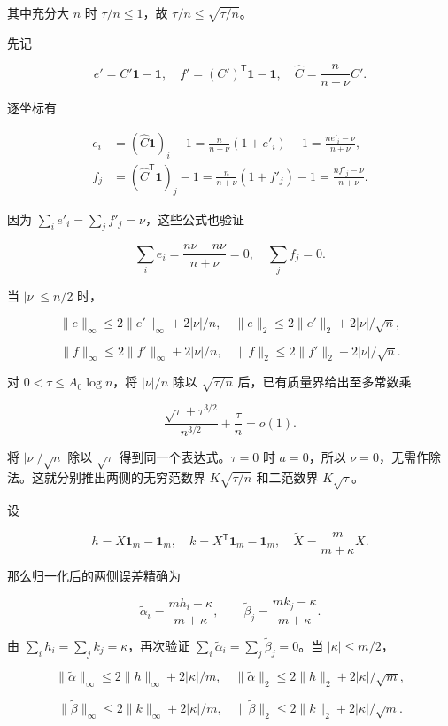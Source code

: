 \documentclass[11pt,a4paper]{article}
\begin{document}
其中充分大 \(n\) 时 \(\tau/n\le1\)，故 \(\tau/n\le\sqrt{\tau/n}\)。

先记

\[
e'=C'\mathbf1-\mathbf1,\quad
f'=(C')^{\mathsf T}\mathbf1-\mathbf1,\quad
\widehat C=\frac n{n+\nu}C'.
\]

逐坐标有

\[
\begin{aligned}
e_i&=(\widehat C\mathbf1)_i-1
=\frac n{n+\nu}(1+e'_i)-1
=\frac{ne'_i-\nu}{n+\nu},\\
f_j&=(\widehat C^{\mathsf T}\mathbf1)_j-1
=\frac n{n+\nu}(1+f'_j)-1
=\frac{nf'_j-\nu}{n+\nu}.
\end{aligned}
\]

因为 \(\sum_ie'_i=\sum_jf'_j=\nu\)，这些公式也验证

\[
\sum_ie_i=\frac{n\nu-n\nu}{n+\nu}=0,\quad
\sum_jf_j=0.
\]

当 \(|\nu|\le n/2\) 时，

\[
\|e\|_\infty\le2\|e'\|_\infty+2|\nu|/n,\quad
\|e\|_2\le2\|e'\|_2+2|\nu|/\sqrt n,
\]

\[
\|f\|_\infty\le2\|f'\|_\infty+2|\nu|/n,\quad
\|f\|_2\le2\|f'\|_2+2|\nu|/\sqrt n.
\]

对 \(0<\tau\le A_0\log n\)，将 \(|\nu|/n\) 除以 \(\sqrt{\tau/n}\) 后，已有质量界给出至多常数乘

\[
\frac{\sqrt\tau+\tau^{3/2}}{n^{3/2}}+\frac\tau n=o(1).
\]

将 \(|\nu|/\sqrt n\) 除以 \(\sqrt\tau\) 得到同一个表达式。\(\tau=0\) 时 \(a=0\)，所以 \(\nu=0\)，无需作除法。这就分别推出两侧的无穷范数界 \(K\sqrt{\tau/n}\) 和二范数界 \(K\sqrt\tau\)。

设

\[
h=X\mathbf1_m-\mathbf1_m,\quad
k=X^{\mathsf T}\mathbf1_m-\mathbf1_m,\quad
\widetilde X=\frac m{m+\kappa}X.
\]

那么归一化后的两侧误差精确为

\[
\widetilde\alpha_i=\frac{mh_i-\kappa}{m+\kappa},\qquad
\widetilde\beta_j=\frac{mk_j-\kappa}{m+\kappa}.
\]

由 \(\sum_ih_i=\sum_jk_j=\kappa\)，再次验证 \(\sum_i\widetilde\alpha_i=\sum_j\widetilde\beta_j=0\)。当 \(|\kappa|\le m/2\)，

\[
\|\widetilde\alpha\|_\infty\le2\|h\|_\infty+2|\kappa|/m,
\quad\|\widetilde\alpha\|_2\le2\|h\|_2+2|\kappa|/\sqrt m,
\]

\[
\|\widetilde\beta\|_\infty\le2\|k\|_\infty+2|\kappa|/m,
\quad\|\widetilde\beta\|_2\le2\|k\|_2+2|\kappa|/\sqrt m.
\]
\end{document}
